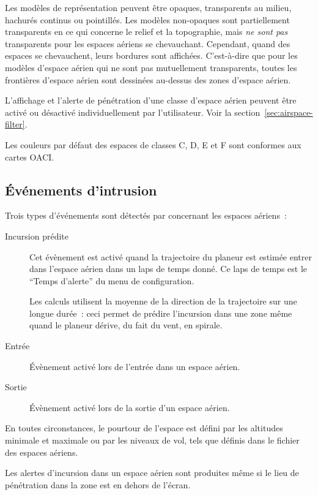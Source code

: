 Les modèles de représentation peuvent être opaques, transparents au milieu, hachurés  continus ou pointillés. Les modèles non-opaques sont partiellement transparents en ce qui concerne le relief et la topographie, mais \emph{ne sont pas} transparents pour les espaces aériens se chevauchant. Cependant, quand des espaces se chevauchent, leurs bordures sont affichées. C'est-à-dire que pour les modèles d'espace aérien qui ne sont pas mutuellement transparents, toutes les frontières d'espace aérien sont dessinées au-dessus des zones d'espace aérien.

L'affichage et l'alerte de pénétration d'une classe d'espace aérien peuvent être activé ou désactivé individuellement par l'utilisateur. Voir la section~\ref{sec:airspace-filter}.

Les couleurs par défaut des espaces de classes C, D, E et F sont conformes aux cartes OACI.


\subsection*{Événements d'intrusion}

Trois types d'événements sont détectés par \xc{} concernant les espaces aériens~:
\begin{description}
\item[Incursion prédite] Cet évènement est activé quand la trajectoire du planeur est estimée entrer dans l'espace aérien dans un laps de temps donné. Ce laps de temps est le ``Temps d'alerte'' du menu de configuration.

Les calculs utilisent la moyenne de la direction de la trajectoire sur une longue durée~: ceci permet de prédire l'incursion dans une zone même quand le planeur dérive, du fait du vent, en spirale.



\item[Entrée] Évènement activé lors de l'entrée dans un espace aérien.
\item[Sortie] Évènement activé lors de la sortie d'un espace aérien.
\end{description}
En toutes circonstances, le pourtour de l'espace est défini par les altitudes minimale et maximale ou par les niveaux de vol, tels que définis dans le fichier des espaces aériens.

Les alertes d'incursion dans un espace aérien sont produites même si le lieu de pénétration dans la zone est en dehors de l'écran.

